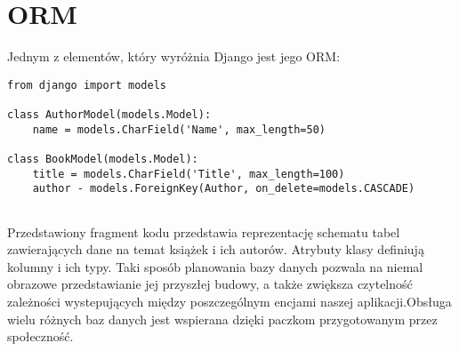 \section{ORM}
Jednym z elementów, który wyróżnia Django jest jego ORM:
\begin{lstlisting}
from django import models

class AuthorModel(models.Model):
	name = models.CharField('Name', max_length=50)

class BookModel(models.Model):
	title = models.CharField('Title', max_length=100)
	author - models.ForeignKey(Author, on_delete=models.CASCADE)
	
\end{lstlisting}

Przedstawiony fragment kodu przedstawia reprezentację schematu tabel zawierających dane na temat książek i ich autorów. Atrybuty klasy definiują kolumny i ich typy.\cite{djangobestpractices} 
Taki sposób planowania bazy danych pozwala na niemal obrazowe przedstawianie jej przyszłej budowy, a także zwiększa czytelność zależności wystepujących między poszczególnym encjami naszej aplikacji.Obsługa wielu różnych baz danych jest wspierana dzięki paczkom przygotowanym przez społeczność. 